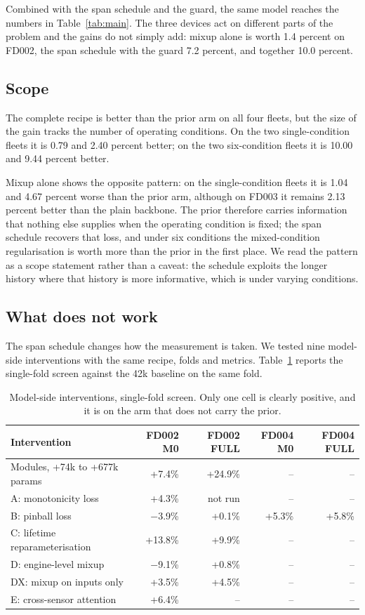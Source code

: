 \documentclass[journal]{IEEEtran}
\begin{document}
Combined with the span schedule and the guard, the same model reaches the numbers in Table~\ref{tab:main}. The three devices act on different parts of the problem and the gains do not simply add: mixup alone is worth 1.4 percent on FD002, the span schedule with the guard 7.2 percent, and together 10.0 percent.

\subsection{Scope}
The complete recipe is better than the prior arm on all four fleets, but the size of the gain tracks the number of operating conditions. On the two single-condition fleets it is 0.79 and 2.40 percent better; on the two six-condition fleets it is 10.00 and 9.44 percent better.

Mixup alone shows the opposite pattern: on the single-condition fleets it is 1.04 and 4.67 percent worse than the prior arm, although on FD003 it remains 2.13 percent better than the plain backbone. The prior therefore carries information that nothing else supplies when the operating condition is fixed; the span schedule recovers that loss, and under six conditions the mixed-condition regularisation is worth more than the prior in the first place. We read the pattern as a scope statement rather than a caveat: the schedule exploits the longer history where that history is more informative, which is under varying conditions.

\subsection{What does not work}\label{sec:negative}
The span schedule changes how the measurement is taken. We tested nine model-side interventions with the same recipe, folds and metrics. Table~\ref{tab:neg} reports the single-fold screen against the 42k baseline on the same fold.

\begin{table}[t]
\centering
\caption{Model-side interventions, single-fold screen. Only one cell is clearly positive, and it is on the arm that does not carry the prior.}
\label{tab:neg}
\small
\begin{tabular}{lrrrr}
\toprule
Intervention & FD002 M0 & FD002 FULL & FD004 M0 & FD004 FULL \\
\midrule
Modules, +74k to +677k params & +7.4\% & +24.9\% & -- & -- \\
A: monotonicity loss & +4.3\% & not run & -- & -- \\
B: pinball loss & $-$3.9\% & +0.1\% & +5.3\% & +5.8\% \\
C: lifetime reparameterisation & +13.8\% & +9.9\% & -- & -- \\
D: engine-level mixup & $-$9.1\% & +0.8\% & -- & -- \\
DX: mixup on inputs only & +3.5\% & +4.5\% & -- & -- \\
E: cross-sensor attention & +6.4\% & -- & -- & -- \\
\bottomrule
\end{tabular}
\end{table}
\end{document}
